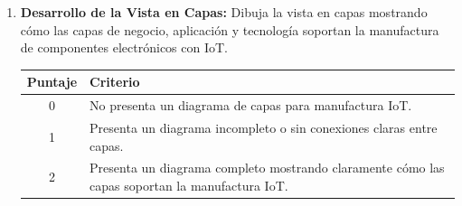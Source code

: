 \documentclass{article}
\begin{document}
\begin{enumerate}
    \item \textbf{Desarrollo de la Vista en Capas:}
    Dibuja la vista en capas mostrando cómo las capas de negocio, aplicación y tecnología soportan la manufactura de componentes electrónicos con IoT.
    
    
    \begin{table}[h!]
    \centering
    \begin{tabular}{|c|p{10cm}|}
    \hline
    \textbf{Puntaje} & \textbf{Criterio} \\ \hline
    0 & No presenta un diagrama de capas para manufactura IoT. \\ \hline
    1 & Presenta un diagrama incompleto o sin conexiones claras entre capas. \\ \hline
    2 & Presenta un diagrama completo mostrando claramente cómo las capas soportan la manufactura IoT. \\ \hline
    \end{tabular}
    \end{table}

\end{enumerate}
\end{document}
